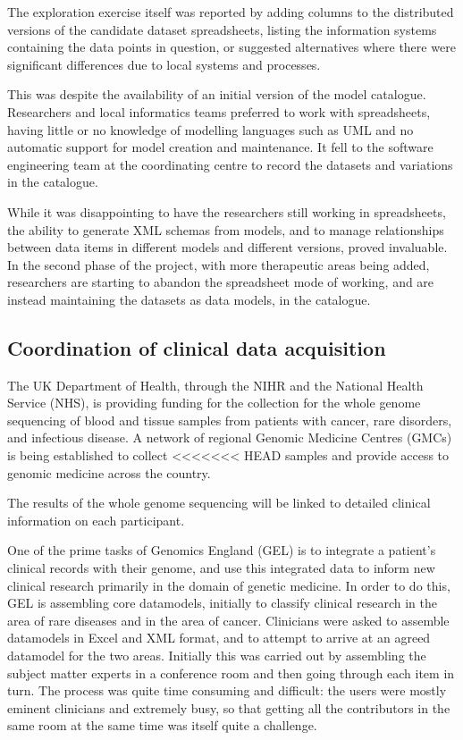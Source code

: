The exploration exercise itself was reported by adding columns to the
distributed versions of the candidate dataset spreadsheets, listing
the information systems containing the data points in question, or
suggested alternatives where there were significant differences due to
local systems and processes.

This was despite the availability of an initial version of the model
catalogue.  Researchers and local informatics teams preferred to work
with spreadsheets, having little or no knowledge of modelling
languages such as UML and no automatic support for model creation and
maintenance.  It fell to the software engineering team at the
coordinating centre to record the datasets and variations in the
catalogue.

While it was disappointing to have the researchers still working in
spreadsheets, the ability to generate XML schemas from models, and to
manage relationships between data items in different models and
different versions, proved invaluable.  In the second phase of the
project, with more therapeutic areas being added, researchers are
starting to abandon the spreadsheet mode of working, and are instead
maintaining the datasets as data models, in the catalogue.

\subsection{Coordination of clinical data acquisition}

The UK Department of Health, through the NIHR and the National Health
Service (NHS), is providing funding for the collection for the whole
genome sequencing of blood and tissue samples from patients with
cancer, rare disorders, and infectious disease.  A network of regional
Genomic Medicine Centres (GMCs) is being established to collect
<<<<<<< HEAD
samples and provide access to genomic medicine across the country.  

The results of the whole genome sequencing will be linked to detailed
clinical information on each participant.  

One of the prime tasks of Genomics England (GEL) is to integrate a
patient's clinical records with their genome, and use this integrated
data to inform new clinical research primarily in the domain of
genetic medicine. In order to do this, GEL is assembling core
datamodels, initially to classify clinical research in the area of
rare diseases and in the area of cancer.  Clinicians were asked to
assemble datamodels in Excel and XML format, and to attempt to arrive
at an agreed datamodel for the two areas.  Initially this was carried
out by assembling the subject matter experts in a conference room and
then going through each item in turn. The process was quite time
consuming and difficult: the users were mostly eminent clinicians and
extremely busy, so that getting all the contributors in the same room
at the same time was itself quite a challenge.


